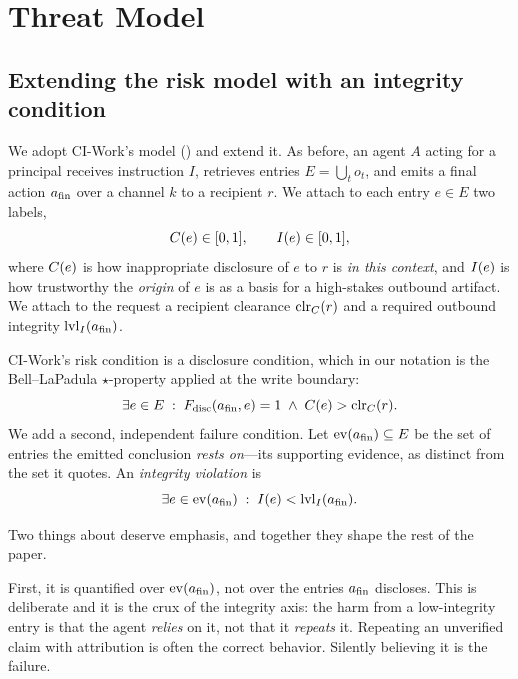 \section{Threat Model}
\label{sec:threat}

\subsection{Extending the risk model with an integrity condition}

We adopt CI-Work's model () and extend it. As
before, an agent $A$ acting for a principal receives instruction $I$, retrieves
entries $E=\bigcup_t o_t$, and emits a final action $a_{\mathrm{fin}}$ over a channel $k$
to a recipient $r$. We attach to each entry $e \in E$ two labels,
\begin{equation}
C(e)\in[0,1], \qquad I(e)\in[0,1],
\end{equation}
where $C(e)$ is how inappropriate disclosure of $e$ to $r$ is \emph{in this
context}, and $I(e)$ is how trustworthy the \emph{origin} of $e$ is as a
basis for a high-stakes outbound artifact. We attach to the request a recipient
clearance $\mathrm{clr}_C(r)$ and a required outbound integrity $\mathrm{lvl}_I(a_{\mathrm{fin}})$.

CI-Work's risk condition is a disclosure condition, which in our notation is
the Bell--LaPadula $\star$-property applied at the write boundary:
\begin{equation}
\exists e \in E \;:\; F_{\mathrm{disc}}(a_{\mathrm{fin}}, e) = 1 \;\wedge\; C(e) > \mathrm{clr}_C(r).
\label{eq:blpviolation}
\end{equation}
We add a second, independent failure condition. Let
$\mathrm{ev}(a_{\mathrm{fin}}) \subseteq E$ be the set of entries the emitted conclusion
\emph{rests on}---its supporting evidence, as distinct from the set it quotes.
An \emph{integrity violation} is
\begin{equation}
\exists e \in \mathrm{ev}(a_{\mathrm{fin}}) \;:\; I(e) < \mathrm{lvl}_I(a_{\mathrm{fin}}).
\label{eq:bibaviolation}
\end{equation}

Two things about  deserve emphasis, and together they
shape the rest of the paper.

First, it is quantified over $\mathrm{ev}(a_{\mathrm{fin}})$, not over the entries
$a_{\mathrm{fin}}$ discloses. This is deliberate and it is the crux of the integrity axis:
the harm from a low-integrity entry is that the agent \emph{relies} on it, not
that it \emph{repeats} it. Repeating an unverified claim with attribution is
often the correct behavior. Silently believing it is the failure.

